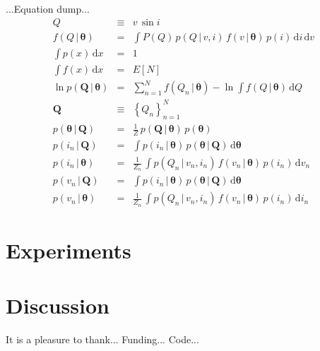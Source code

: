 \documentclass[12pt, preprint]{aastex}
\newcommand{\setof}[1]{\left\{{#1}\right\}}
\newcommand{\given}{\,|\,}
\newcommand{\dd}{\mathrm{d}}
\newcommand{\catalog}{\bm{Q}}
\newcommand{\pars}{\bm{\theta}}
\begin{document}
...Equation dump...
\begin{eqnarray}
Q &\equiv& v\,\sin i
\\
f(Q\given\pars) &=& \int P(Q)\,p(Q\given v,i)\,f(v\given\pars)\,p(i)\,\dd i\,\dd v
\\
\int p(x)\,\dd x &=& 1
\\
\int f(x)\,\dd x &=& E[N]
\\
\ln p(\catalog\given\pars) &=& \sum_{n=1}^N f(Q_n\given\pars) - \ln \int f(Q\given\pars)\,\dd Q
\\
\catalog &\equiv& \setof{Q_n}_{n=1}^N
\\
p(\pars\given\catalog) &=& \frac{1}{Z}\,p(\catalog\given\pars)\,p(\pars)
\\
p(i_n\given\catalog) &=& \int p(i_n\given\pars)\,p(\pars\given\catalog)\,\dd\pars
\\
p(i_n\given\pars) &=& \frac{1}{Z_n}\,\int p(Q_n\given v_n,i_n)\,f(v_n\given\pars)\,p(i_n)\,\dd v_n
\\
p(v_n\given\catalog) &=& \int p(i_n\given\pars)\,p(\pars\given\catalog)\,\dd\pars
\\
p(v_n\given\pars) &=& \frac{1}{Z_n}\,\int p(Q_n\given v_n,i_n)\,f(v_n\given\pars)\,p(i_n)\,\dd i_n
\end{eqnarray}

\section{Experiments}

\section{Discussion}

\acknowledgements
It is a pleasure to thank...
Funding...
Code...
\end{document}
